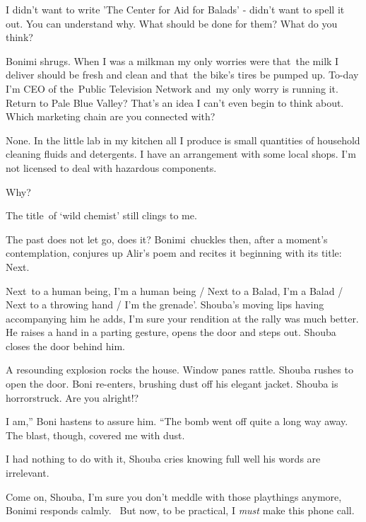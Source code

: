 \documentclass[letterpaper]{article}
\begin{document}
{\textquotedbl}I didn't want to write 'The Center for Aid for Balads' - didn't want to spell it out. You can understand
why. What should be done for them? What do you think?{\textquotedbl}

Bonimi shrugs. {\textquotedbl}When I was a milkman my only worries were that~the milk I deliver should be fresh and
clean and that~the bike's tires be pumped up. To-day I'm CEO of the~Public Television Network and~my only worry is
running it.~ Return to Pale Blue Valley? That's an idea I can't even begin to think about. Which marketing chain are
you connected with?{\textquotedbl}

{\textquotedbl}None. In the little lab in my kitchen all I produce is small quantities of household cleaning fluids and
detergents. I have an arrangement with some local shops. I'm not licensed to deal with hazardous
components.{\textquotedbl} 

{\textquotedbl}Why?{\textquotedbl}

{\textquotedbl}The title~of `wild chemist' still clings to me.{\textquotedbl} 

{\textquotedbl}The past does not let go, does it?{\textquotedbl} Bonimi~chuckles then, after a moment's contemplation,
conjures up Alir's poem and recites it beginning with its title: {\textquotedbl}Next. 

Next~to a human being, I'm a human being / Next to a Balad, I'm a Balad / Next to a throwing hand / I'm the
grenade'.{\textquotedbl} Shouba's moving lips having accompanying him he adds, {\textquotedbl}I'm sure your rendition
at the rally was much better.{\textquotedbl} He raises a hand in a parting gesture, opens the door and steps out.
Shouba closes the door behind him.

A resounding explosion rocks the house. Window panes rattle. Shouba rushes to open the door. Boni re-enters, brushing
dust off his elegant jacket. Shouba is horrorstruck. {\textquotedbl}Are you alright!?{\textquotedbl} 

{\textquotedbl}I am,'' Boni hastens to assure him. ``The bomb went off quite a long way away. The blast, though, covered
me with dust.{\textquotedbl} 

{\textquotedbl}I had nothing to do with it,{\textquotedbl} Shouba cries knowing full well his words are irrelevant.

{\textquotedbl}Come on, Shouba, I'm sure you don't meddle with those playthings anymore,{\textquotedbl} Bonimi responds
calmly. \ {\textquotedbl}But now, to be practical, I \textit{must }make this phone call.{\textquotedbl}
\end{document}
